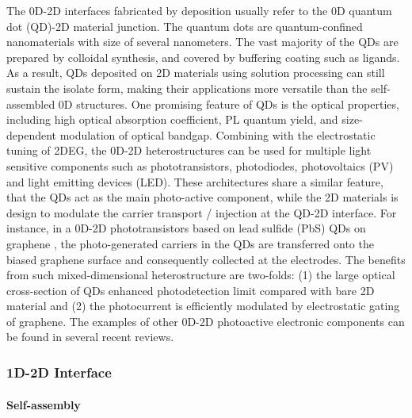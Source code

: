 The 0D-2D interfaces fabricated by deposition usually refer to the 0D
quantum dot (QD)-2D material junction. The quantum dots are
quantum-confined nano\-materials with size of several
nano\-meters. 
%
The vast majority of the QDs are prepared by colloidal synthesis, and
covered by buffering coating such as ligands. 
%
As a result, QDs deposited on 2D materials using solution processing
can still sustain the isolate form, making their applications more
versatile than the self-assembled 0D structures.
%
One promising feature of QDs is the optical properties, including high
optical absorption coefficient, PL quantum yield, and size-dependent
modulation of optical bandgap.
%
Combining with the electrostatic tuning of 2DEG, the 0D-2D
heterostructures can be used for multiple light sensitive components
such as photo\-transistors, photo\-diodes, photo\-voltaics (PV) and
light emitting devices (LED). 
%
These architectures share a similar feature, that the QDs act as the
main photo-active component, while the 2D materials is design to
modulate the carrier transport / injection at the QD-2D interface.
%
For instance, in a 0D-2D photo\-transistors based on lead sulfide
(PbS) QDs on graphene , the
photo-generated carriers in the QDs are transferred onto the biased
graphene surface and consequently collected at the electrodes. The
benefits from such mixed-dimensional heterostructure are two-folds:
(1) the large optical cross-section of QDs enhanced photo\-detection
limit compared with bare 2D material and (2) the photo\-current is
efficiently modulated by electrostatic gating of graphene.
%
The examples of other 0D-2D photo\-active electronic components can be
found in several recent reviews. 


\subsubsection{1D-2D Interface}
\label{sec:orgeadf57e}

\paragraph{Self-assembly}


